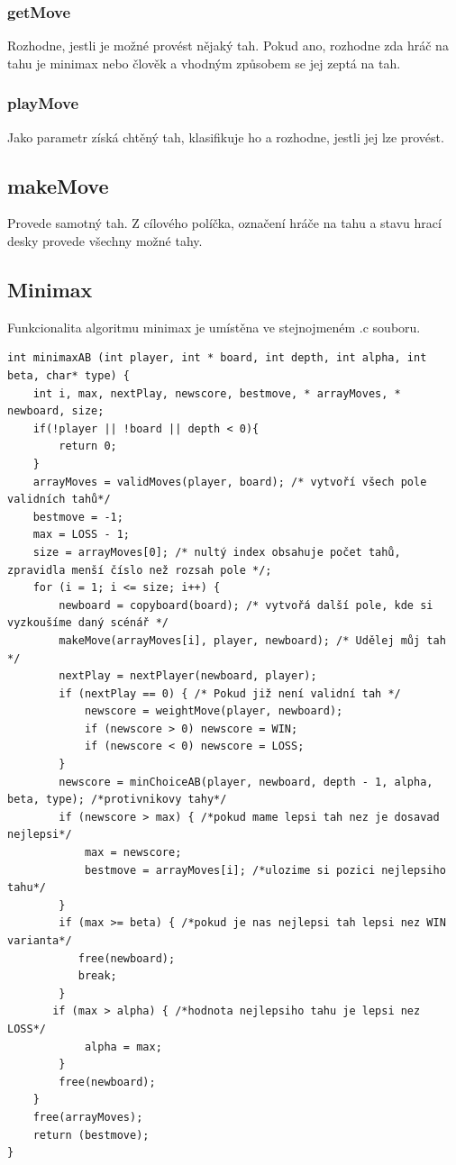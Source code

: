 \documentclass[
12pt,
a4paper,
pdftex,
czech,
titlepage
]{report}
\begin{document}
\subsubsection{getMove}
Rozhodne, jestli je možné provést nějaký tah. Pokud ano, rozhodne zda hráč na tahu je minimax nebo člověk a vhodným způsobem se jej zeptá na tah.

\subsubsection{playMove}
Jako parametr získá chtěný tah, klasifikuje ho a rozhodne, jestli jej lze provést.

\subsection{makeMove}
Provede samotný tah. Z cílového políčka, označení hráče na tahu a stavu hrací desky provede všechny možné tahy.

\subsection{Minimax}
Funkcionalita algoritmu minimax je umístěna ve stejnojmeném .c souboru. 
\begin{verbatim}
int minimaxAB (int player, int * board, int depth, int alpha, int beta, char* type) {
    int i, max, nextPlay, newscore, bestmove, * arrayMoves, * newboard, size;
    if(!player || !board || depth < 0){
        return 0;
    }
    arrayMoves = validMoves(player, board); /* vytvoří všech pole validních tahů*/
    bestmove = -1;
    max = LOSS - 1;
    size = arrayMoves[0]; /* nultý index obsahuje počet tahů, zpravidla menší číslo než rozsah pole */;
    for (i = 1; i <= size; i++) {
        newboard = copyboard(board); /* vytvořá další pole, kde si vyzkoušíme daný scénář */
        makeMove(arrayMoves[i], player, newboard); /* Udělej můj tah */
        nextPlay = nextPlayer(newboard, player);
        if (nextPlay == 0) { /* Pokud již není validní tah */
            newscore = weightMove(player, newboard);
            if (newscore > 0) newscore = WIN;
            if (newscore < 0) newscore = LOSS;
        }
        newscore = minChoiceAB(player, newboard, depth - 1, alpha, beta, type); /*protivnikovy tahy*/
        if (newscore > max) { /*pokud mame lepsi tah nez je dosavad nejlepsi*/
            max = newscore;
            bestmove = arrayMoves[i]; /*ulozime si pozici nejlepsiho tahu*/
        }
        if (max >= beta) { /*pokud je nas nejlepsi tah lepsi nez WIN varianta*/
           free(newboard);
           break;
        }
       if (max > alpha) { /*hodnota nejlepsiho tahu je lepsi nez LOSS*/
            alpha = max;
        }
        free(newboard);
    }
    free(arrayMoves);
    return (bestmove);
}
\end{verbatim}
\end{document}
